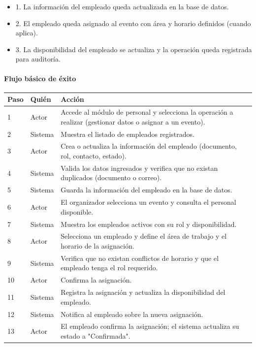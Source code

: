 \begin{description}[leftmargin=!, labelwidth=3.4cm, style=nextline, topsep=3pt]
\item[Post-condiciones] \hfill
\begin{itemize}[leftmargin=1.2em, topsep=1pt]
  \item 1. La información del empleado queda actualizada en la base de datos.
  \item 2. El empleado queda asignado al evento con área y horario definidos (cuando aplica).
  \item 3. La disponibilidad del empleado se actualiza y la operación queda registrada para auditoría.
\end{itemize}

\end{description}

\paragraph{Flujo básico de éxito}
\begin{longtable}{P{1.1cm}P{1.8cm}P{10.5cm}}
\toprule
\textbf{Paso} & \textbf{Quién} & \textbf{Acción}\\
\midrule
{} & Actor & Accede al módulo de personal y selecciona la operación a realizar (gestionar datos o asignar a un evento).\\
2 & Sistema & Muestra el listado de empleados registrados.\\
3 & Actor & Crea o actualiza la información del empleado (documento, rol, contacto, estado).\\
4 & Sistema & Valida los datos ingresados y verifica que no existan duplicados (documento o correo).\\
5 & Sistema & Guarda la información del empleado en la base de datos.\\
6 & Actor & El organizador selecciona un evento y consulta el personal disponible.\\
7 & Sistema & Muestra los empleados activos con su rol y disponibilidad.\\
8 & Actor & Selecciona un empleado y define el área de trabajo y el horario de la asignación.\\
9 & Sistema & Verifica que no existan conflictos de horario y que el empleado tenga el rol requerido.\\
10 & Actor & Confirma la asignación.\\
11 & Sistema & Registra la asignación y actualiza la disponibilidad del empleado.\\
12 & Sistema & Notifica al empleado sobre la nueva asignación.\\
13 & Actor & El empleado confirma la asignación; el sistema actualiza su estado a "Confirmada".\\
\bottomrule
\end{longtable}


